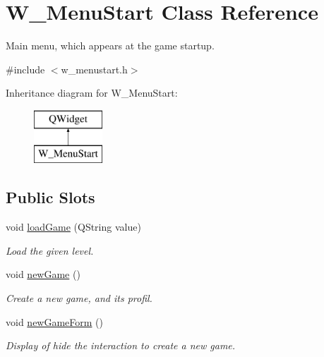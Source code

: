 \hypertarget{class_w___menu_start}{}\section{W\+\_\+\+Menu\+Start Class Reference}
\label{class_w___menu_start}


Main menu, which appears at the game startup.  




{\ttfamily \#include $<$w\+\_\+menustart.\+h$>$}

Inheritance diagram for W\+\_\+\+Menu\+Start\+:\begin{figure}[H]
\begin{center}
\leavevmode
\includegraphics[height=2.000000cm]{class_w___menu_start}
\end{center}
\end{figure}
\subsection*{Public Slots}
\begin{DoxyCompactItemize}
\item 
void \hyperlink{class_w___menu_start_aca05c93827e90a48e5044846e0a76f23}{load\+Game} (Q\+String value)
\begin{DoxyCompactList}\small\item\em Load the given level. \end{DoxyCompactList}\item 
\hypertarget{class_w___menu_start_a5dbc5260b96e79bdd2a55c54095f9853}{}void \hyperlink{class_w___menu_start_a5dbc5260b96e79bdd2a55c54095f9853}{new\+Game} ()\label{class_w___menu_start_a5dbc5260b96e79bdd2a55c54095f9853}

\begin{DoxyCompactList}\small\item\em Create a new game, and its profil. \end{DoxyCompactList}\item 
\hypertarget{class_w___menu_start_aff79d990b8166fe640fad052d7271a30}{}void \hyperlink{class_w___menu_start_aff79d990b8166fe640fad052d7271a30}{new\+Game\+Form} ()\label{class_w___menu_start_aff79d990b8166fe640fad052d7271a30}

\begin{DoxyCompactList}\small\item\em Display of hide the interaction to create a new game. \end{DoxyCompactList}\end{DoxyCompactItemize}
